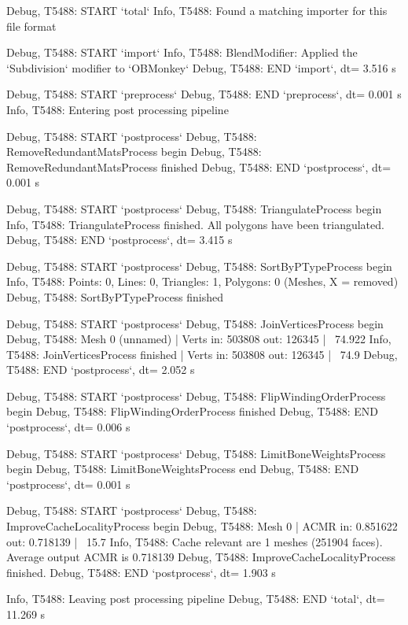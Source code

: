 \begin{DoxyVerb}Debug, T5488: START `total`
Info,  T5488: Found a matching importer for this file format


Debug, T5488: START `import`
Info,  T5488: BlendModifier: Applied the `Subdivision` modifier to `OBMonkey`
Debug, T5488: END   `import`, dt= 3.516 s


Debug, T5488: START `preprocess`
Debug, T5488: END   `preprocess`, dt= 0.001 s
Info,  T5488: Entering post processing pipeline


Debug, T5488: START `postprocess`
Debug, T5488: RemoveRedundantMatsProcess begin
Debug, T5488: RemoveRedundantMatsProcess finished 
Debug, T5488: END   `postprocess`, dt= 0.001 s


Debug, T5488: START `postprocess`
Debug, T5488: TriangulateProcess begin
Info,  T5488: TriangulateProcess finished. All polygons have been triangulated.
Debug, T5488: END   `postprocess`, dt= 3.415 s


Debug, T5488: START `postprocess`
Debug, T5488: SortByPTypeProcess begin
Info,  T5488: Points: 0, Lines: 0, Triangles: 1, Polygons: 0 (Meshes, X = removed)
Debug, T5488: SortByPTypeProcess finished

Debug, T5488: START `postprocess`
Debug, T5488: JoinVerticesProcess begin
Debug, T5488: Mesh 0 (unnamed) | Verts in: 503808 out: 126345 | ~74.922
Info,  T5488: JoinVerticesProcess finished | Verts in: 503808 out: 126345 | ~74.9
Debug, T5488: END   `postprocess`, dt= 2.052 s

Debug, T5488: START `postprocess`
Debug, T5488: FlipWindingOrderProcess begin
Debug, T5488: FlipWindingOrderProcess finished
Debug, T5488: END   `postprocess`, dt= 0.006 s


Debug, T5488: START `postprocess`
Debug, T5488: LimitBoneWeightsProcess begin
Debug, T5488: LimitBoneWeightsProcess end
Debug, T5488: END   `postprocess`, dt= 0.001 s


Debug, T5488: START `postprocess`
Debug, T5488: ImproveCacheLocalityProcess begin
Debug, T5488: Mesh 0 | ACMR in: 0.851622 out: 0.718139 | ~15.7
Info,  T5488: Cache relevant are 1 meshes (251904 faces). Average output ACMR is 0.718139
Debug, T5488: ImproveCacheLocalityProcess finished. 
Debug, T5488: END   `postprocess`, dt= 1.903 s


Info,  T5488: Leaving post processing pipeline
Debug, T5488: END   `total`, dt= 11.269 s
\end{DoxyVerb}


